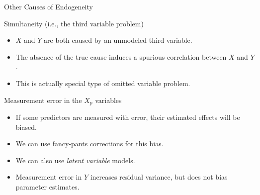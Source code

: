 \documentclass{beamer}\usepackage[]{graphicx}\usepackage[]{color}
\begin{document}

\begin{frame}{Other Causes of Endogeneity}
  
  Simultaneity (i.e., the third variable problem)
  \begin{itemize}
  \item $X$ and $Y$ are both caused by an unmodeled third variable.
  \item The absence of the true cause induces a spurious correlation between 
    $X$ and $Y$.
  \item This is actually special type of omitted variable problem.
  \end{itemize}
  \vb
  Measurement error in the $X_p$ variables
  \begin{itemize}
  \item If some predictors are measured with error, their estimated effects will 
    be biased.
  \item We can use fancy-pants corrections for this bias.
  \item We can also use \emph{latent variable} models.
  \item Measurement error in $Y$ increases residual variance, but does not bias 
    parameter estimates.
  \end{itemize}
  
\end{frame}

\watermarkoff %
\end{document}
